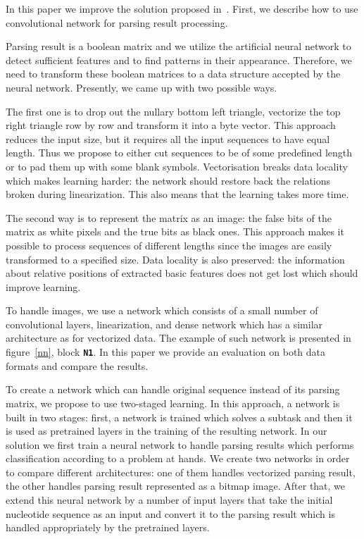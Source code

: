 \documentclass[12pt,a4paper]{cibb}
\begin{document}
In this paper we improve the solution proposed in~\cite{grigorevcomposition}.
First, we describe how to use convolutional network for parsing result processing.

Parsing result is a boolean matrix and we utilize the artificial neural network to detect sufficient features and to find patterns in their appearance.
Therefore, we need to transform these boolean matrices to a data structure accepted by the neural network.
Presently, we came up with two possible ways.

The first one is to drop out the nullary bottom left triangle, vectorize the top right triangle row by row and transform it into a byte vector.
This approach reduces the input size, but it requires all the input sequences to have equal length.
Thus we propose to either cut sequences to be of some predefined length or to pad them up with some blank symbols.
Vectorisation breaks data locality which makes learning harder: the network should restore back the relations broken during linearization.
This also means that the learning takes more time.

The second way is to represent the matrix as an image: the false bits of the matrix as white pixels and the true bits as black ones.
This approach makes it possible to process sequences of different lengths since the images are easily transformed to a specified size.
Data locality is also preserved: the information about relative positions of extracted basic features does not get lost which should improve learning.

To handle images, we use a network which consists of a small number of convolutional layers, linearization, and dense network which has a similar architecture as for vectorized data.
The example of such network is presented in figure~\ref{nn}, block \textbf{\texttt{N1}}.
In this paper we provide an evaluation on both data formats and compare the results.

To create a network which can handle original sequence instead of its parsing matrix, we propose to use two-staged learning.
In this approach, a network is built in two stages: first, a network is trained which solves a subtask and then it is used as pretrained layers in the training of the resulting network.
In our solution we first train a neural network to handle parsing results which performs classification according to a problem at hands.
We create two networks in order to compare different architectures: one of them handles vectorized parsing result, the other handles parsing result represented as a bitmap image.
After that, we extend this neural network by a number of input layers that take the initial nucleotide sequence as an input and convert it to the parsing result which is handled appropriately by the pretrained layers.
\end{document}
